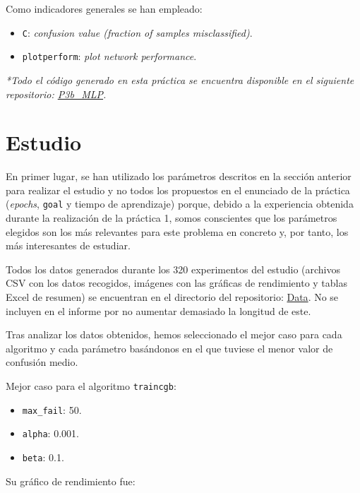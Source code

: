 \documentclass[a4paper,12pt,titlepage]{article}
\begin{document}
Como indicadores generales se han empleado:

\begin{itemize}[noitemsep]
	\item \lstinline|C|: \textit{confusion value (fraction of samples misclassified)}.
	\item \lstinline|plotperform|: \textit{plot network performance}. \citep{matlab:plotperform}
\end{itemize}

\emph{*Todo el código generado en esta práctica se encuentra disponible en el siguiente repositorio: 
\href{https://github.com/davidmigloz/neuronal-networks/tree/master/P3b\_MLP/}{P3b\_MLP}.}

\section{Estudio}

En primer lugar, se han utilizado los parámetros descritos en la sección anterior para realizar el estudio y no todos los propuestos en el enunciado de la práctica (\textit{epochs}, \lstinline|goal| y tiempo de aprendizaje) porque, debido a la experiencia obtenida durante la realización de la práctica 1, somos conscientes que los parámetros elegidos son los más relevantes para este problema en concreto y, por tanto, los más interesantes de estudiar.

Todos los datos generados durante los 320 experimentos del estudio (archivos CSV con los datos recogidos, imágenes con las gráficas de rendimiento y tablas Excel de resumen) se encuentran en el directorio del repositorio: \href{https://github.com/davidmigloz/neuronal-networks/tree/master/P3b\_MLP/data}{Data}. No se incluyen en el informe por no aumentar demasiado la longitud de este.

Tras analizar los datos obtenidos, hemos seleccionado el mejor caso para cada algoritmo y cada parámetro basándonos en el que tuviese el menor valor de confusión medio.

Mejor caso para el algoritmo \lstinline|traincgb|:

\begin{itemize}[noitemsep]
	\item \lstinline|max_fail|: 50.
	\item \lstinline|alpha|: 0.001.
	\item \lstinline|beta|: 0.1.
\end{itemize}

Su gráfico de rendimiento fue:
\end{document}

